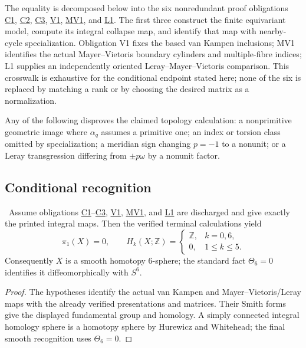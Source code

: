 The equality is decomposed below into the six nonredundant proof obligations
\hyperref[obl:C1]{C1}, \hyperref[obl:C2]{C2}, \hyperref[obl:C3]{C3},
\hyperref[obl:V1]{V1}, \hyperref[obl:MV1]{MV1}, and
\hyperref[obl:L1]{L1}.  The first three construct the finite equivariant
model, compute its integral collapse map, and identify that map with
nearby-cycle specialization.  Obligation V1 fixes the based van Kampen
inclusions; MV1 identifies the actual Mayer--Vietoris boundary cylinders and
multiple-fibre indices; L1 supplies an independently oriented
Leray--Mayer--Vietoris comparison.  This crosswalk is exhaustive for the
conditional endpoint stated here; none of the six is replaced by matching a
rank or by choosing the desired matrix as a normalization.

\begin{test}
Any of the following disproves the claimed topology calculation: a nonprimitive geometric image where $\alpha_q$ assumes a primitive one; an index or torsion class omitted by specialization; a meridian sign changing $p=-1$ to a nonunit; or a Leray transgression differing from $\pm p\omega$ by a nonunit factor.
\end{test}

\subsection{Conditional recognition}

\begin{theorem}
\Conditional\ Assume obligations \hyperref[obl:C1]{C1}--\hyperref[obl:C3]{C3},
\hyperref[obl:V1]{V1}, \hyperref[obl:MV1]{MV1}, and
\hyperref[obl:L1]{L1} are discharged and give exactly the printed integral
maps. Then the verified terminal calculations yield
\[
\pi_1(X)=0,\qquad H_k(X;\mathbb Z)=
\begin{cases}
\mathbb Z,&k=0,6,\\
0,&1\le k\le5.
\end{cases}
\]
Consequently $X$ is a smooth homotopy $6$-sphere; the standard fact $\Theta_6=0$ identifies it diffeomorphically with $S^6$.
\end{theorem}

\begin{proof}
The hypotheses identify the actual van Kampen and Mayer--Vietoris/Leray maps with the already verified presentations and matrices. Their Smith forms give the displayed fundamental group and homology. A simply connected integral homology sphere is a homotopy sphere by Hurewicz and Whitehead; the final smooth recognition uses $\Theta_6=0$.
\end{proof}
